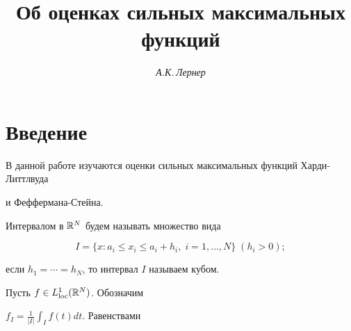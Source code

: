 





\author{\it А.К.\,Лернер} 


\title{Об оценках сильных максимальных функций} 


 


\date{} 




 


\pagestyle{plain} %


 


 




 


\maketitle 


 




 


\section{Введение} 


В данной работе изучаются оценки сильных максимальных функций Харди-Литтлвуда 


и Феффермана-Стейна. 


 


Интервалом в $\Bbb R^N$ будем называть множество вида 


$$ 


I=\{x:a_i\le x_i\le a_i+h_i, \; i=1,\dotsc,N\} \; (h_i>0); 


$$ 


если $h_1=\dotsb=h_N$, то интервал $I$ называем кубом. 


 


Пусть $f\in L^1_{\operatorname{loc}}(\Bbb R^N)$. Обозначим 


$f_I=\frac{1}{|I|}\int_I f(t)dt$. Равенствами 


